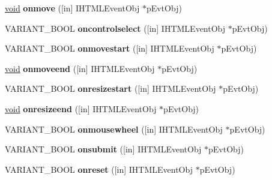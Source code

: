 \begin{DoxyCompactItemize}
\hyperlink{interfacevoid}{void} {\bfseries onmove} (\mbox{[}in\mbox{]} I\+H\+T\+M\+L\+Event\+Obj $\ast$p\+Evt\+Obj)
\item 
\mbox{\label{interface_m_s_h_t_m_l_1_1_h_t_m_l_form_element_events2_a6307b7fc7bc2865eb1cdef5920f2201a}} 
V\+A\+R\+I\+A\+N\+T\+\_\+\+B\+O\+OL {\bfseries oncontrolselect} (\mbox{[}in\mbox{]} I\+H\+T\+M\+L\+Event\+Obj $\ast$p\+Evt\+Obj)
\item 
\mbox{\label{interface_m_s_h_t_m_l_1_1_h_t_m_l_form_element_events2_a767b9b150780d8103f4ba8f679c2696b}} 
V\+A\+R\+I\+A\+N\+T\+\_\+\+B\+O\+OL {\bfseries onmovestart} (\mbox{[}in\mbox{]} I\+H\+T\+M\+L\+Event\+Obj $\ast$p\+Evt\+Obj)
\item 
\mbox{\label{interface_m_s_h_t_m_l_1_1_h_t_m_l_form_element_events2_af548095e39126d08c8206bcd6038c9c9}} 
\hyperlink{interfacevoid}{void} {\bfseries onmoveend} (\mbox{[}in\mbox{]} I\+H\+T\+M\+L\+Event\+Obj $\ast$p\+Evt\+Obj)
\item 
\mbox{\label{interface_m_s_h_t_m_l_1_1_h_t_m_l_form_element_events2_a32d92c6c570cef71c4c63905d2a5bab5}} 
V\+A\+R\+I\+A\+N\+T\+\_\+\+B\+O\+OL {\bfseries onresizestart} (\mbox{[}in\mbox{]} I\+H\+T\+M\+L\+Event\+Obj $\ast$p\+Evt\+Obj)
\item 
\mbox{\label{interface_m_s_h_t_m_l_1_1_h_t_m_l_form_element_events2_a8b6f8c397151577de36b24a5bc55f687}} 
\hyperlink{interfacevoid}{void} {\bfseries onresizeend} (\mbox{[}in\mbox{]} I\+H\+T\+M\+L\+Event\+Obj $\ast$p\+Evt\+Obj)
\item 
\mbox{\label{interface_m_s_h_t_m_l_1_1_h_t_m_l_form_element_events2_a119c4a77bda9650992ab1703529d8614}} 
V\+A\+R\+I\+A\+N\+T\+\_\+\+B\+O\+OL {\bfseries onmousewheel} (\mbox{[}in\mbox{]} I\+H\+T\+M\+L\+Event\+Obj $\ast$p\+Evt\+Obj)
\item 
\mbox{\label{interface_m_s_h_t_m_l_1_1_h_t_m_l_form_element_events2_a145f38af0caadc2fda38f89246609194}} 
V\+A\+R\+I\+A\+N\+T\+\_\+\+B\+O\+OL {\bfseries onsubmit} (\mbox{[}in\mbox{]} I\+H\+T\+M\+L\+Event\+Obj $\ast$p\+Evt\+Obj)
\item 
\mbox{\label{interface_m_s_h_t_m_l_1_1_h_t_m_l_form_element_events2_a57a4f7ad4370eda20b6b9769a4448f6c}} 
V\+A\+R\+I\+A\+N\+T\+\_\+\+B\+O\+OL {\bfseries onreset} (\mbox{[}in\mbox{]} I\+H\+T\+M\+L\+Event\+Obj $\ast$p\+Evt\+Obj)
\end{DoxyCompactItemize}
